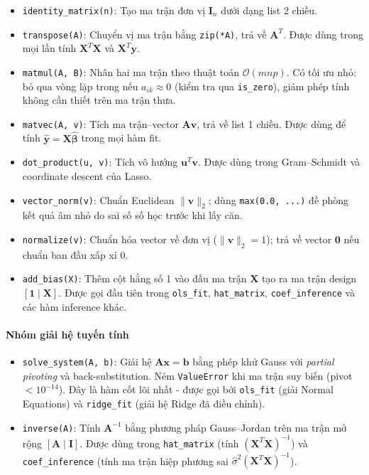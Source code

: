 \begin{itemize}
    \item \texttt{identity\_matrix(n)}: Tạo ma trận đơn vị $\mathbf{I}_n$ dưới dạng list 2 chiều.
    \item \texttt{transpose(A)}: Chuyển vị ma trận bằng \texttt{zip(*A)}, trả về $\mathbf{A}^T$. Được dùng trong mọi lần tính $\mathbf{X}^T\mathbf{X}$ và $\mathbf{X}^T\mathbf{y}$.
    \item \texttt{matmul(A, B)}: Nhân hai ma trận theo thuật toán $\mathcal{O}(mnp)$. Có tối ưu nhỏ: bỏ qua vòng lặp trong nếu $a_{ik} \approx 0$ (kiểm tra qua \texttt{is\_zero}), giảm phép tính không cần thiết trên ma trận thưa.
    \item \texttt{matvec(A, v)}: Tích ma trận--vector $\mathbf{A}\mathbf{v}$, trả về list 1 chiều. Được dùng để tính $\hat{\mathbf{y}} = \mathbf{X}\hat{\boldsymbol{\beta}}$ trong mọi hàm fit.
    \item \texttt{dot\_product(u, v)}: Tích vô hướng $\mathbf{u}^T\mathbf{v}$. Được dùng trong Gram--Schmidt và coordinate descent của Lasso.
    \item \texttt{vector\_norm(v)}: Chuẩn Euclidean $\|\mathbf{v}\|_2$; dùng \texttt{max(0.0, ...)} đề phòng kết quả âm nhỏ do sai số số học trước khi lấy căn.
    \item \texttt{normalize(v)}: Chuẩn hóa vector về đơn vị ($\|\mathbf{v}\|_2 = 1$); trả về vector $\mathbf{0}$ nếu chuẩn ban đầu xấp xỉ 0.
    \item \texttt{add\_bias(X)}: Thêm cột hằng số 1 vào đầu ma trận $\mathbf{X}$ tạo ra ma trận design $[\mathbf{1} \mid \mathbf{X}]$. Được gọi đầu tiên trong \texttt{ols\_fit}, \texttt{hat\_matrix}, \texttt{coef\_inference} và các hàm inference khác.
\end{itemize}

\paragraph{Nhóm giải hệ tuyến tính}

\begin{itemize}
    \item \texttt{solve\_system(A, b)}: Giải hệ $\mathbf{A}\mathbf{x} = \mathbf{b}$ bằng phép khử Gauss với \emph{partial pivoting} và back-substitution. Ném \texttt{ValueError} khi ma trận suy biến (pivot $< 10^{-14}$). Đây là hàm cốt lõi nhất - được gọi bởi \texttt{ols\_fit} (giải Normal Equations) và \texttt{ridge\_fit} (giải hệ Ridge đã điều chỉnh).
    \item \texttt{inverse(A)}: Tính $\mathbf{A}^{-1}$ bằng phương pháp Gauss--Jordan trên ma trận mở rộng $[\mathbf{A} \mid \mathbf{I}]$. Được dùng trong \texttt{hat\_matrix} (tính $(\mathbf{X}^T\mathbf{X})^{-1}$) và \texttt{coef\_inference} (tính ma trận hiệp phương sai $\hat{\sigma}^2(\mathbf{X}^T\mathbf{X})^{-1}$).
\end{itemize}

